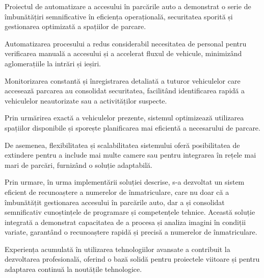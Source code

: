 \documentclass[a4paper,12pt]{report}
\begin{document}
Proiectul de automatizare a accesului în parcările auto a demonstrat o serie de îmbunătățiri semnificative în eficiența operațională, securitatea sporită și gestionarea optimizată a spațiilor de parcare.

Automatizarea procesului a redus considerabil necesitatea de personal pentru verificarea manuală a accesului și a accelerat fluxul de vehicule, minimizând aglomerațiile la intrări și ieșiri.

Monitorizarea constantă și înregistrarea detaliată a tuturor vehiculelor care accesează parcarea au consolidat securitatea, facilitând identificarea rapidă a vehiculelor neautorizate sau a activităților suspecte.

Prin urmărirea exactă a vehiculelor prezente, sistemul optimizează utilizarea spațiilor disponibile și sporește planificarea mai eficientă a necesarului de parcare.

De asemenea, flexibilitatea și scalabilitatea sistemului oferă posibilitatea de extindere pentru a include mai multe camere sau pentru integrarea în rețele mai mari de parcări, furnizând o soluție adaptabilă.

Prin urmare, în urma implementării soluției descrise, s-a dezvoltat un sistem eficient de recunoaștere a numerelor de înmatriculare, care nu doar că a îmbunătățit gestionarea accesului în parcările auto, dar a și consolidat semnificativ cunoștințele de programare și competențele tehnice. Această soluție integrată a demonstrat capacitatea de a procesa și analiza imagini în condiții variate, garantând o recunoaștere rapidă și precisă a numerelor de înmatriculare.

Experiența acumulată în utilizarea tehnologiilor avansate a contribuit la dezvoltarea profesională, oferind o bază solidă pentru proiectele viitoare și pentru adaptarea continuă la noutățile tehnologice.



\cite{1}
\cite{2}
\cite{3}
\cite{4}
\cite{5}
\cite{6}
\cite{7}
\cite{8}
\cite{9}
\cite{10}
\cite{11}
\cite{12}
\cite{13}
\cite{14}
\cite{15}
\end{document}
